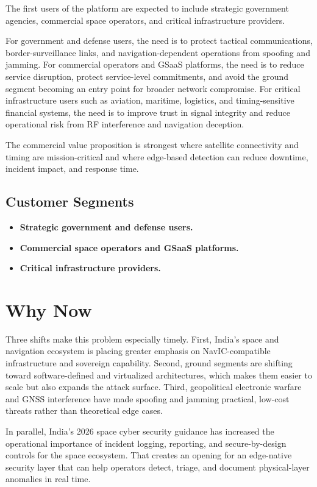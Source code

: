 \documentclass[11pt,a4paper]{article}
\begin{document}
The first users of the platform are expected to include strategic government agencies, commercial space operators, and critical infrastructure providers.

For government and defense users, the need is to protect tactical communications, border-surveillance links, and navigation-dependent operations from spoofing and jamming. For commercial operators and GSaaS platforms, the need is to reduce service disruption, protect service-level commitments, and avoid the ground segment becoming an entry point for broader network compromise. For critical infrastructure users such as aviation, maritime, logistics, and timing-sensitive financial systems, the need is to improve trust in signal integrity and reduce operational risk from RF interference and navigation deception.

The commercial value proposition is strongest where satellite connectivity and timing are mission-critical and where edge-based detection can reduce downtime, incident impact, and response time.

\subsection{Customer Segments}

\begin{itemize}
    \item \textbf{Strategic government and defense users.}
    \item \textbf{Commercial space operators and GSaaS platforms.}
    \item \textbf{Critical infrastructure providers.}
\end{itemize}

\section{Why Now}

Three shifts make this problem especially timely. First, India’s space and navigation ecosystem is placing greater emphasis on NavIC-compatible infrastructure and sovereign capability. Second, ground segments are shifting toward software-defined and virtualized architectures, which makes them easier to scale but also expands the attack surface. Third, geopolitical electronic warfare and GNSS interference have made spoofing and jamming practical, low-cost threats rather than theoretical edge cases.

In parallel, India’s 2026 space cyber security guidance has increased the operational importance of incident logging, reporting, and secure-by-design controls for the space ecosystem. That creates an opening for an edge-native security layer that can help operators detect, triage, and document physical-layer anomalies in real time.
\end{document}
